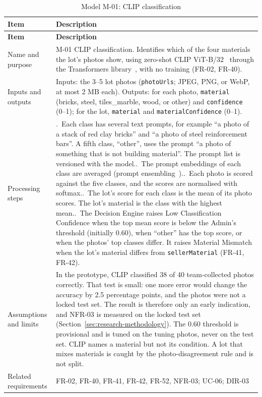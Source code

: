 {\footnotesize
\begin{longtable}{@{}>{\raggedright\arraybackslash}p{}>{\raggedright\arraybackslash}p{}@{}}
\caption{Model M-01: CLIP classification}\label{tab:m-01}\\
\toprule
\textbf{Item} & \textbf{Description} \\
\midrule
\endfirsthead
\toprule
\textbf{Item} & \textbf{Description} \\
\midrule
\endhead
Name and purpose & M-01 CLIP classification. Identifies which of the four materials the lot's photos show, using zero-shot CLIP ViT-B/32~\citep{radford2021clip} through the Transformers library~\citep{wolf2020transformers}, with no training (FR-02, FR-40). \\
Inputs and outputs & Inputs: the 3--5 lot photos (\texttt{photoUrls}; JPEG, PNG, or WebP, at most 2 MB each). Outputs: for each photo, \texttt{material} (bricks, steel, tiles\_marble, wood, or other) and \texttt{confidence} (0--1); for the lot, \texttt{material} and \texttt{materialConfidence} (0--1). \\
Processing steps & 1.~Each class has several text prompts, for example ``a photo of a stack of red clay bricks'' and ``a photo of steel reinforcement bars''. A fifth class, ``other'', uses the prompt ``a photo of something that is not building material''. The prompt list is versioned with the model.\newline
2.~The prompt embeddings of each class are averaged (prompt ensembling~\citep{radford2021clip}).\newline
3.~Each photo is scored against the five classes, and the scores are normalised with softmax.\newline
4.~The lot's score for each class is the mean of its photo scores. The lot's material is the class with the highest mean.\newline
5.~The Decision Engine raises Low Classification Confidence when the top mean score is below the Admin's threshold (initially 0.60), when ``other'' has the top score, or when the photos' top classes differ. It raises Material Mismatch when the lot's material differs from \texttt{sellerMaterial} (FR-41, FR-42). \\
Assumptions and limits & In the prototype, CLIP classified 38 of 40 team-collected photos correctly. That test is small: one more error would change the accuracy by 2.5 percentage points, and the photos were not a locked test set. The result is therefore only an early indication, and NFR-03 is measured on the locked test set (Section~\ref{sec:research-methodology}). The 0.60 threshold is provisional and is tuned on the tuning photos, never on the test set. CLIP names a material but not its condition. A lot that mixes materials is caught by the photo-disagreement rule and is not split. \\
Related requirements & FR-02, FR-40, FR-41, FR-42, FR-52, NFR-03; UC-06; DIR-03 \\
\bottomrule
\end{longtable}
}

